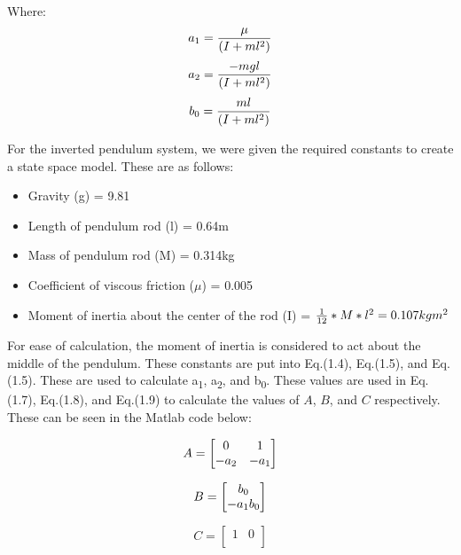 \documentclass[11pt]{report}
\begin{document}
Where: 
\begin{equation}
a\textsubscript{1} = \frac{\mu}{(I + ml^2)}
\end{equation}
\begin{equation}
a\textsubscript{2} = \frac{-mgl}{(I + ml^2)}
\end{equation}
\begin{equation}
b\textsubscript{0} = \frac{ml}{(I + ml^2)}
\end{equation}

For the inverted pendulum system, we were given the required constants to create a state space model. These are as follows: 
\begin{itemize}
\item{Gravity (g) = 9.81}
\item{Length of pendulum rod (l) = 0.64m}
\item{Mass of pendulum rod (M) = 0.314kg}
\item{Coefficient of viscous friction ($\mu$) = 0.005}
\item{Moment of inertia about the center of the rod (I) = $\frac{1}{12}*M*l^2 = 0.107  kgm\textsuperscript{2}$}
\end{itemize}

For ease of calculation, the moment of inertia is considered to act about the middle of the pendulum. These constants are put into Eq.(1.4), Eq.(1.5), and Eq.(1.5). These are used to calculate a\textsubscript{1}, a\textsubscript{2}, and b\textsubscript{0}. These values are used in Eq.(1.7), Eq.(1.8), and Eq.(1.9) to calculate the values of $A$, $B$, and $C$ respectively. These can be seen in the Matlab code below:

\begin{equation}
A 
=
\begin{bmatrix}
0 & 1\\
-a\textsubscript{2} &  -a\textsubscript{1}\\
\end{bmatrix}
\end{equation}

\begin{equation}
B
=
\begin{bmatrix}
b\textsubscript{0}\\
-a\textsubscript{1}b\textsubscript{0}\\
\end{bmatrix}
\end{equation}

\begin{equation}
C
=
\begin{bmatrix}
1 & 0\\
\end{bmatrix}
\end{equation}
\end{document}
